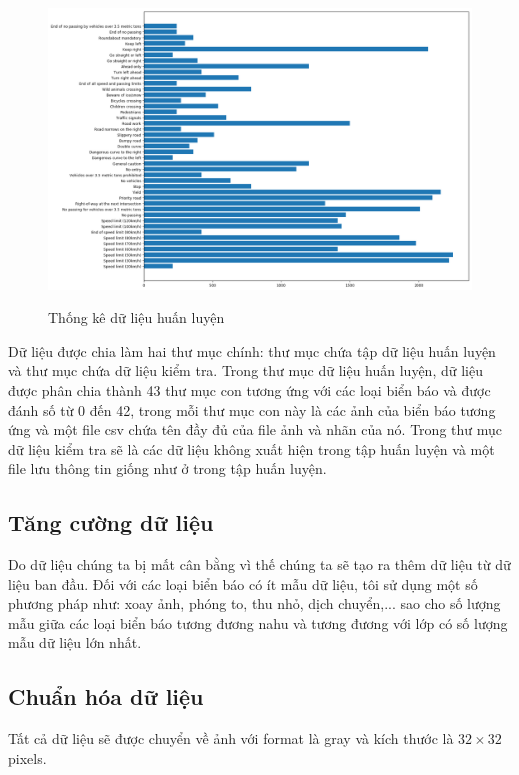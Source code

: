 \begin{figure}[H]
\begin{center}
\label{fig:data_sample}
\includegraphics[scale=0.3]{chap5/image/data_statistic.png}
\caption{Thống kê dữ liệu huấn luyện}
\end{center}
\end{figure}
Dữ liệu được chia làm hai thư mục chính: thư mục chứa tập dữ liệu huấn luyện và thư mục chứa dữ liệu kiểm tra. Trong thư mục dữ liệu huấn luyện, dữ liệu được phân chia thành 43 thư mục con tương ứng với các loại biển báo và được đánh số từ 0 đến 42, trong mỗi thư mục con này là các ảnh của biển báo tương ứng và một file csv chứa tên đầy đủ của file ảnh và nhãn của nó. Trong thư mục dữ liệu kiểm tra sẽ là các dữ liệu không xuất hiện trong tập huấn luyện và một file lưu thông tin giống như ở trong tập huấn luyện.
\subsection{Tăng cường dữ liệu}
\hspace{5mm} Do dữ liệu chúng ta bị mất cân bằng vì thế chúng ta sẽ tạo ra thêm dữ liệu từ dữ liệu ban đầu. Đối với các loại biển báo có ít mẫu dữ liệu, tôi sử dụng một số phương pháp như: xoay ảnh, phóng to, thu nhỏ, dịch chuyển,... sao cho số lượng mẫu giữa các loại biển báo tương đương nahu và tương đương với lớp có số lượng mẫu dữ liệu lớn nhất.
\subsection{Chuẩn hóa dữ liệu}
Tất cả dữ liệu sẽ được chuyển về ảnh với format là gray và kích thước là $32 \times 32$ pixels.